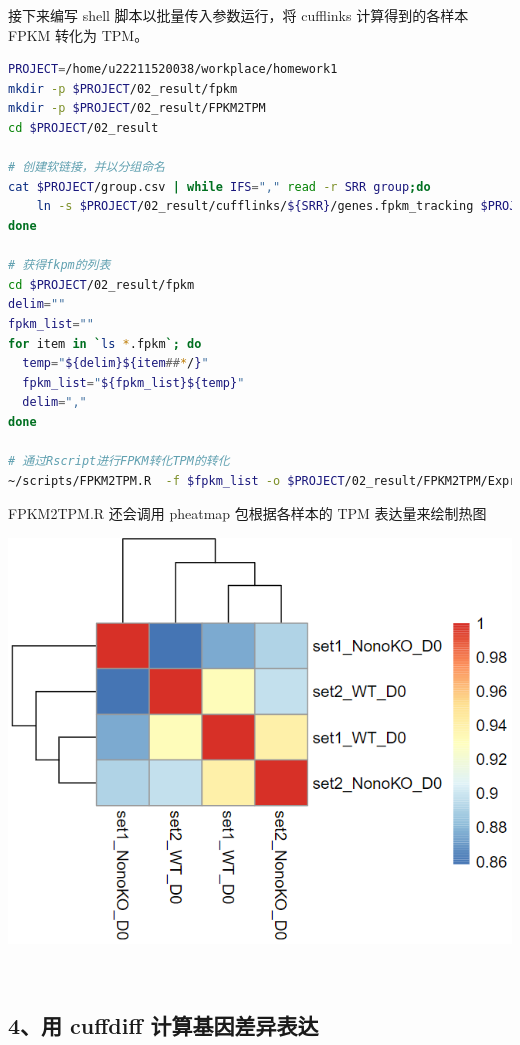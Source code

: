 \documentclass[
  a4paper,
]{article}
\begin{document}
接下来编写 shell 脚本以批量传入参数运行，将 cufflinks 计算得到的各样本
FPKM 转化为 TPM。

\begin{lstlisting}[language=bash]
PROJECT=/home/u22211520038/workplace/homework1
mkdir -p $PROJECT/02_result/fpkm
mkdir -p $PROJECT/02_result/FPKM2TPM
cd $PROJECT/02_result

# 创建软链接，并以分组命名
cat $PROJECT/group.csv | while IFS="," read -r SRR group;do
    ln -s $PROJECT/02_result/cufflinks/${SRR}/genes.fpkm_tracking $PROJECT/02_result/fpkm/${group}.fpkm
done

# 获得fkpm的列表
cd $PROJECT/02_result/fpkm
delim=""
fpkm_list=""
for item in `ls *.fpkm`; do
  temp="${delim}${item##*/}"
  fpkm_list="${fpkm_list}${temp}"
  delim=","
done

# 通过Rscript进行FPKM转化TPM的转化
~/scripts/FPKM2TPM.R  -f $fpkm_list -o $PROJECT/02_result/FPKM2TPM/Expression
\end{lstlisting}

FPKM2TPM.R 还会调用 pheatmap 包根据各样本的 TPM 表达量来绘制热图

\includegraphics{assets/image-20220924223301-uunvmdm.png}\hspace{0pt}

‍

\hypertarget{ux7528-cuffdiff-ux8ba1ux7b97ux57faux56e0ux5deeux5f02ux8868ux8fbe}{%
\subsection{4、用 cuffdiff
计算基因差异表达}\label{ux7528-cuffdiff-ux8ba1ux7b97ux57faux56e0ux5deeux5f02ux8868ux8fbe}}
\end{document}
